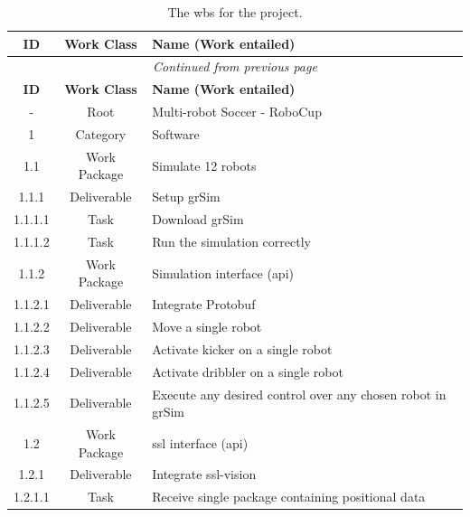 \begin{longtable}{|c|c|m{}|}
    \caption{The \ac{wbs} for the project.} \label{tab:wbs} \\
    \hline
    \textbf{ID} & \textbf{Work Class} & \textbf{Name (Work entailed)} \\ \hline
    \endfirsthead
    \multicolumn{3}{|c|}{\textit{Continued from previous page}} \\ \hline
    \textbf{ID} & \textbf{Work Class} & \textbf{Name (Work entailed)} \\ \hline
    \endhead
    \hline
    \endfoot
    \hline
    \hline
    \endlastfoot
    \rowcolor{root} - & Root & Multi-robot Soccer - RoboCup \\ \hline
    \rowcolor{c1} 1 & Category & Software \\ \hline
    \rowcolor{c1-wp} 1.1 & Work Package & Simulate 12 robots \\ \hline
    \rowcolor{c1-d} 1.1.1 & Deliverable & Setup grSim \\ \hline
    \rowcolor{c1-t} 1.1.1.1 & Task & Download grSim \\ \hline
    \rowcolor{c1-t} 1.1.1.2 & Task & Run the simulation correctly \\ \hline
    \rowcolor{c1-wp} 1.1.2 & Work Package & Simulation interface (\acs{api}) \\ \hline
    \rowcolor{c1-d} 1.1.2.1 & Deliverable & Integrate Protobuf \\ \hline
    \rowcolor{c1-d} 1.1.2.2 & Deliverable & Move a single robot \\ \hline
    \rowcolor{c1-d} 1.1.2.3 & Deliverable & Activate kicker on a single robot \\ \hline
    \rowcolor{c1-d} 1.1.2.4 & Deliverable & Activate dribbler on a single robot \\ \hline
    \rowcolor{c1-d} 1.1.2.5 & Deliverable & Execute any desired control over any chosen robot in grSim \\ \hline
    \rowcolor{c1-wp} 1.2 & Work Package & \acs{ssl} interface (\acs{api}) \\ \hline
    \rowcolor{c1-d} 1.2.1 & Deliverable & Integrate ssl-vision \\ \hline
    \rowcolor{c1-t} 1.2.1.1 & Task & Receive single package containing positional data \\ \hline

\end{longtable}
